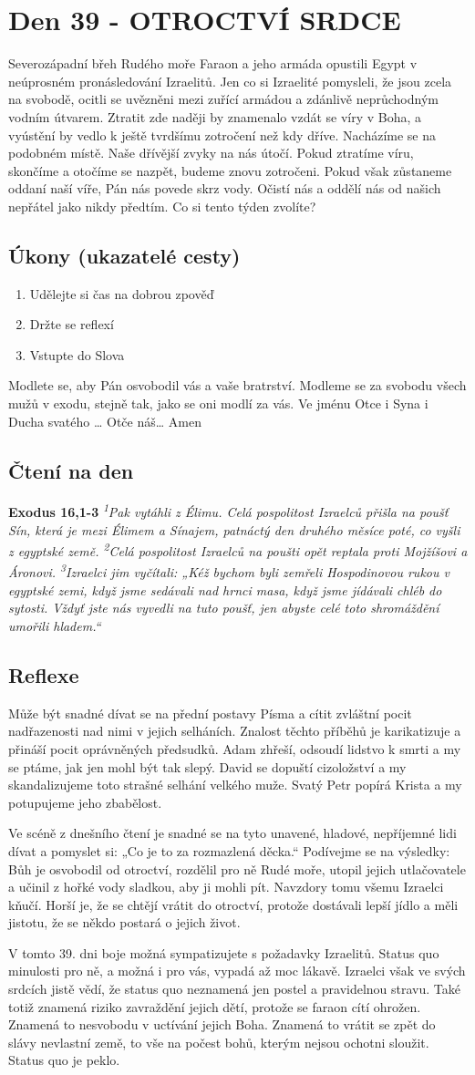 \documentclass[11pt]{article}
\newcommand{\zacatekSestyTyden}{
  Severozápadní břeh Rudého moře \newline 
  Faraon a jeho armáda opustili Egypt v neúprosném pronásledování Izraelitů. Jen co si Izraelité pomysleli, že jsou zcela na svobodě, ocitli se uvězněni mezi zuřící armádou a zdánlivě neprůchodným vodním útvarem. Ztratit zde naději by znamenalo vzdát se víry v Boha, a vyústění by vedlo k ještě tvrdšímu zotročení než kdy dříve. Nacházíme se na podobném místě. Naše dřívější zvyky na nás útočí. Pokud ztratíme víru, skončíme a otočíme se nazpět, budeme znovu zotročeni. Pokud však zůstaneme oddaní naší víře, Pán nás povede skrz vody. Očistí nás a oddělí nás od našich nepřátel jako nikdy předtím. Co si tento týden zvolíte?

\subsection*{Úkony (ukazatelé cesty)}
\begin{enumerate}
  \item Udělejte si čas na dobrou zpověď
  \item Držte se reflexí
  \item Vstupte do Slova
\end{enumerate}
Modlete se, aby Pán osvobodil vás a vaše bratrství. \newline
Modleme se za svobodu všech mužů v exodu, stejně tak, jako se oni modlí za vás.\newline
Ve jménu Otce i Syna i Ducha svatého …  Otče náš… Amen
}
\begin{document}
\newpage
\section{Den 39 - OTROCTVÍ SRDCE}
\zacatekSestyTyden
\subsection*{Čtení na den}
\textbf{Exodus 16,1-3}
\newline
\textit{
\textsuperscript{1}Pak vytáhli z Élimu. Celá pospolitost Izraelců přišla na poušť Sín, která je mezi Élimem a Sínajem, patnáctý den druhého měsíce poté, co vyšli z egyptské země.
\textsuperscript{2}Celá pospolitost Izraelců na poušti opět reptala proti Mojžíšovi a Áronovi.
\textsuperscript{3}Izraelci jim vyčítali: „Kéž bychom byli zemřeli Hospodinovou rukou v egyptské zemi, když jsme sedávali nad hrnci masa, když jsme jídávali chléb do sytosti. Vždyť jste nás vyvedli na tuto poušť, jen abyste celé toto shromáždění umořili hladem.“
}

\subsection*{Reflexe}

Může být snadné dívat se na přední postavy Písma a cítit zvláštní pocit nadřazenosti nad nimi v jejich selháních.
Znalost těchto příběhů je karikatizuje a přináší pocit oprávněných předsudků. Adam zhřeší, odsoudí lidstvo k smrti a
my se ptáme, jak jen mohl být tak slepý. David se dopuští cizoložství a my skandalizujeme toto strašné selhání velkého
muže. Svatý Petr popírá Krista a my potupujeme jeho zbabělost.

Ve scéně z dnešního čtení je snadné se na tyto unavené, hladové, nepříjemné lidi dívat a pomyslet si: „Co je to za
rozmazlená děcka.“ Podívejme se na výsledky: Bůh je osvobodil od otroctví, rozdělil pro ně Rudé moře, utopil jejich
utlačovatele a učinil z hořké vody sladkou, aby ji mohli pít. Navzdory tomu všemu Izraelci kňučí. Horší je, že se chtějí
vrátit do otroctví, protože dostávali lepší jídlo a měli jistotu, že se někdo postará o jejich život.

V tomto 39. dni boje možná sympatizujete s požadavky Izraelitů. Status quo minulosti pro ně, a možná i pro vás,
vypadá až moc lákavě. Izraelci však ve svých srdcích jistě vědí, že status quo neznamená jen postel a pravidelnou
stravu. Také totiž znamená riziko zavraždění jejich dětí, protože se faraon cítí ohrožen. Znamená to nesvobodu
v uctívání jejich Boha. Znamená to vrátit se zpět do slávy nevlastní země, to vše na počest bohů, kterým nejsou ochotni
sloužit. Status quo je peklo.
\end{document}
